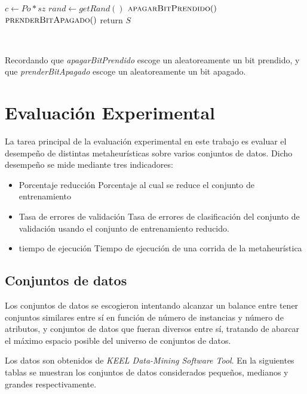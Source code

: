 \documentclass[11pt]{article}
\begin{document}
    {\fontsize{10}{10}\selectfont
    \begin{algorithmic}
        \State $c \gets Po * sz$   
                \State $rand \gets getRand()$     
                \State $\Call{apagarBitPrendido}$ 
                \Else
                \State $\Call{prenderBitApagado}$ 
                \EndIf
            \EndFor
            \State return $S$
        \EndFunction
    \end{algorithmic}
    }

    ~\ 

  Recordando que \emph{apagarBitPrendido} escoge un aleatoreamente un bit prendido,
  y  que \emph{prenderBitApagado} escoge un aleatoreamente un bit apagado.

\section{Evaluación Experimental}

La tarea principal de la evaluación experimental en este trabajo es evaluar el desempeño de distintas metaheurísticas sobre varios conjuntos de datos. Dicho desempeño se mide mediante tres indicadores: 
\begin{itemize}
\item Porcentaje reducción 
    Porcentaje al cual se reduce el conjunto de entrenamiento
\item Tasa de errores de validación
    Tasa de errores de clasificación del conjunto de validación usando el conjunto de entrenamiento reducido.
\item tiempo de ejecución
    Tiempo de ejecución de una corrida de la metaheurística
\end{itemize}


\subsection{Conjuntos de datos}
Los conjuntos de datos se escogieron intentando alcanzar un balance entre tener conjuntos similares entre sí en función de número de instancias y número de atributos, y conjuntos de datos que fueran diversos entre sí, tratando de abarcar el máximo espacio posible del universo de conjuntos de datos.

Los datos son obtenidos de \emph{KEEL Data-Mining Software Tool}. En la siguientes tablas se muestran los conjuntos de datos considerados pequeños, medianos y grandes respectivamente.
\end{document}
